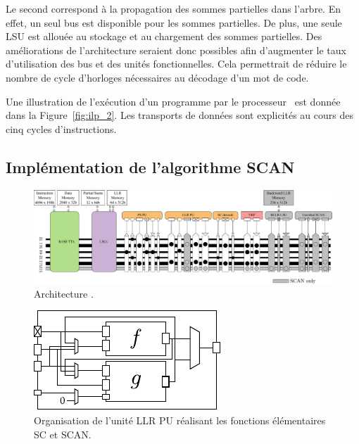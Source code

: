 Le second correspond à la propagation des sommes partielles dans l'arbre. En effet, un seul bus est disponible pour les sommes partielles. De plus, une seule LSU est allouée au stockage et au chargement des sommes partielles. Des améliorations de l'architecture seraient donc possibles afin d'augmenter le taux d'utilisation des bus et des unités fonctionnelles. Cela permettrait de réduire le nombre de cycle d'horloges nécessaires au décodage d'un mot de code.

Une illustration de l'exécution d'un programme par le processeur \TTSC~est donnée dans la Figure~\ref{fig:ilp_2}. Les transports de données sont explicités au cours des cinq cycles d'instructions.



\subsection{Implémentation de l'algorithme SCAN}

\begin{figure}[htp]
	\centering
	\includegraphics[width=\textwidth]{main/ch4_fig/archi_scan}
	\caption{Architecture \TTSCAN.}
	\label{fig:tt_scan}
\end{figure}
\begin{figure}[htp]
\centering
\includegraphics[scale=1.5]{main/ch4_fig/scan_unit}
\caption{Organisation de l'unité \og LLR PU \fg réalisant les fonctions élémentaires SC et SCAN.}
\label{fig:scan_unit}
\end{figure}

